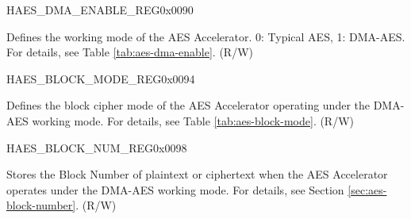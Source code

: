 \begin{register}{H}{AES\_DMA\_ENABLE\_REG}{0x0090}\label{regdesc:AESDMAENABLEREG}
%
%
\regnewline%
\begin{regdesc}\begin{reglist}
\item [AES\_DMA\_ENABLE] Defines the working mode of the AES Accelerator. 0: Typical AES, 1: DMA-AES. For details, see Table \ref{tab:aes-dma-enable}. (R/W) 
\end{reglist}\end{regdesc}
\end{register}


\begin{register}{H}{AES\_BLOCK\_MODE\_REG}{0x0094}\label{regdesc:AESBLOCKMODEREG}
%
%
\regnewline%
\begin{regdesc}\begin{reglist}
\item [AES\_BLOCK\_MODE] Defines the block cipher mode of the AES Accelerator operating under the DMA-AES working mode. For details, see Table \ref{tab:aes-block-mode}. (R/W)
\end{reglist}\end{regdesc}
\end{register}


\begin{register}{H}{AES\_BLOCK\_NUM\_REG}{0x0098}\label{regdesc:AESBLOCKNUMREG}
%
\regnewline%
\begin{regdesc}\begin{reglist}
\item [AES\_BLOCK\_NUM] Stores the Block Number of plaintext or ciphertext when the AES Accelerator operates under the DMA-AES working mode. For details, see Section \ref{sec:aes-block-number}. (R/W)
\end{reglist}\end{regdesc}
\end{register}


